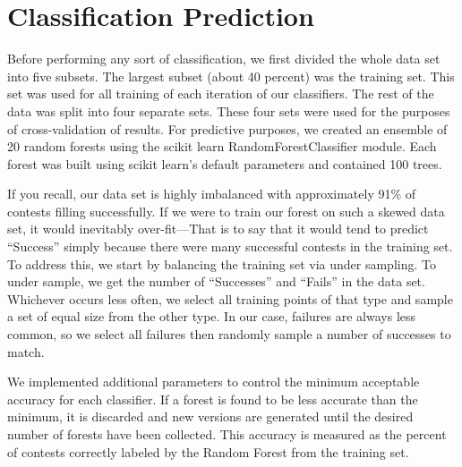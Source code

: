 \section{Classification Prediction}

Before performing any sort of classification, we first divided the whole data set into five subsets. The largest subset (about 40 percent) was the training set. This set was used for all training of each iteration of our classifiers. The rest of the data was split into four separate sets. These four sets were used for the purposes of cross-validation of results. For predictive purposes, we created an ensemble of 20 random forests using the scikit learn RandomForestClassifier module. Each forest was built using scikit learn's default parameters and contained 100 trees.

If you recall, our data set is highly imbalanced with approximately 91\% of contests filling successfully. If we were to train our forest on such a skewed data set, it would inevitably over-fit—That is to say that it would tend to predict ``Success'' simply because there were many successful contests in the training set. To address this, we start by balancing the training set via under sampling. To under sample, we get the number of ``Successes'' and ``Fails'' in the data set. Whichever occurs less often, we select all training points of that type and sample a set of equal size from the other type. In our case, failures are always less common, so we select all failures then randomly sample a number of successes to match.

We implemented additional parameters to control the minimum acceptable accuracy for each classifier. If a forest is found to be less accurate than the minimum, it is discarded and new versions are generated until the desired number of forests have been collected. This accuracy is measured as the percent of contests correctly labeled by the Random Forest from the training set.